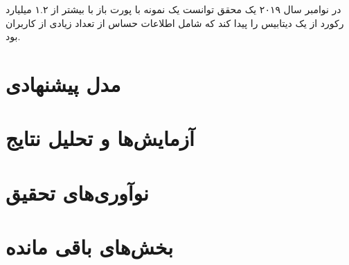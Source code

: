 \documentclass[10pt, a4paper]{article}
\begin{document}
در نوامبر سال ۲۰۱۹ یک محقق توانست یک نمونه با پورت باز با بیشتر از ۱.۲ میلیارد
رکورد از یک دیتابیس را پیدا کند که شامل اطلاعات حساس از تعداد زیادی از کاربران
بود.

\section{مدل پیشنهادی}

\section{آزمایش‌ها و تحلیل نتایج}

\section{نوآوری‌های تحقیق}

\section{بخش‌های باقی مانده}
\end{document}
